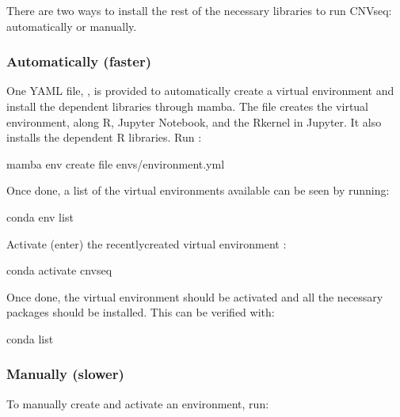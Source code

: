 \documentclass[letterpaper,10pt,english]{sphinxhowto}
\begin{document}
\sphinxAtStartPar
There are two ways to install the rest of the necessary libraries to run CNV\sphinxhyphen{}seq: automatically or manually.


\subsubsection{Automatically (faster)}
\label{\detokenize{index:automatically-faster}}
\sphinxAtStartPar
One YAML file, , is provided to automatically create a virtual environment and install the dependent libraries through mamba. The file creates the  virtual environment, along R, Jupyter Notebook, and the R\sphinxhyphen{}kernel in Jupyter. It also installs the dependent R libraries. Run :

\begin{sphinxVerbatim}[commandchars=\\\{\}]
\PYGZdl{} mamba env create \PYGZhy{}\PYGZhy{}file envs/environment.yml
\end{sphinxVerbatim}

\sphinxAtStartPar
Once done, a list of the virtual environments available can be seen by running:

\begin{sphinxVerbatim}[commandchars=\\\{\}]
\PYGZdl{} conda env list
\end{sphinxVerbatim}

\sphinxAtStartPar
Activate (enter) the recently\sphinxhyphen{}created virtual environment :

\begin{sphinxVerbatim}[commandchars=\\\{\}]
\PYGZdl{} conda activate cnvseq
\end{sphinxVerbatim}

\sphinxAtStartPar
Once done, the virtual environment should be activated and all the necessary packages should be installed. This can be verified with:

\begin{sphinxVerbatim}[commandchars=\\\{\}]
\PYGZdl{} conda list
\end{sphinxVerbatim}


\subsubsection{Manually (slower)}
\label{\detokenize{index:manually-slower}}
\sphinxAtStartPar
To manually create and activate an environment, run:
\end{document}
